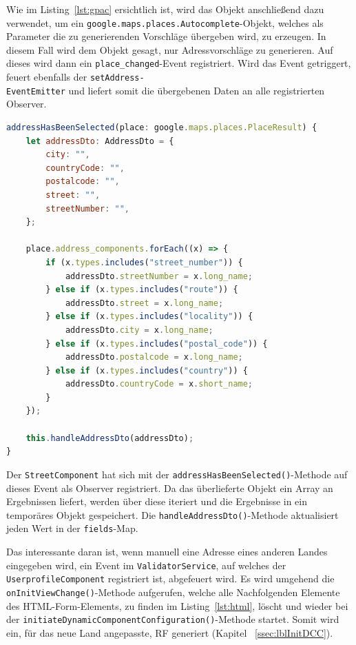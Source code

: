 Wie im Listing~\ref{lst:gpac} ersichtlich ist, wird das Objekt anschließend dazu verwendet, um ein \texttt{google.maps.places.Autocomplete}-Objekt, welches als Parameter die zu generierenden Vorschläge übergeben wird, zu erzeugen. In diesem Fall wird dem Objekt gesagt, nur Adressvorschläge zu generieren. Auf dieses wird dann ein \texttt{place\_changed}-Event registriert. Wird das Event getriggert, feuert ebenfalls der \texttt{setAddress-\\EventEmitter} und liefert somit die übergebenen Daten an alle registrierten Observer.

\begin{lstlisting}[caption={Die \texttt{addressHasBeenSelected()}-Methode der \texttt{StreetComponent}-Klasse}, language=JavaScript,label={lst:gpac}]
addressHasBeenSelected(place: google.maps.places.PlaceResult) {
	let addressDto: AddressDto = {
		city: "",
		countryCode: "",
		postalcode: "",
		street: "",
		streetNumber: "",
	};
	
	place.address_components.forEach((x) => {
		if (x.types.includes("street_number")) {
			addressDto.streetNumber = x.long_name;
		} else if (x.types.includes("route")) {
			addressDto.street = x.long_name;
		} else if (x.types.includes("locality")) {
			addressDto.city = x.long_name;
		} else if (x.types.includes("postal_code")) {
			addressDto.postalcode = x.long_name;
		} else if (x.types.includes("country")) {
			addressDto.countryCode = x.short_name;
		}
	});
	
	this.handleAddressDto(addressDto);
}
\end{lstlisting}

Der \texttt{StreetComponent} hat sich mit der \texttt{addressHasBeenSelected()}-Methode auf dieses Event als Observer registriert. Da das überlieferte Objekt ein Array an Ergebnissen liefert, werden über diese iteriert und die Ergebnisse in ein temporäres Objekt gespeichert. Die \texttt{handleAddressDto()}-Methode aktualisiert jeden Wert in der \texttt{fields}-Map. 

Das interessante daran ist, wenn manuell eine Adresse eines anderen Landes eingegeben wird, ein Event im \texttt{ValidatorService}, auf welches der \texttt{UserprofileComponent} registriert ist, abgefeuert wird. Es wird umgehend die \texttt{onInitViewChange()}-Methode aufgerufen, welche alle Nachfolgenden Elemente des HTML-Form-Elements, zu finden im Listing~\ref{lst:html}, löscht und wieder bei der \texttt{initiateDynamicComponentConfiguration()}-Methode startet. Somit wird ein, für das neue Land angepasste, RF generiert (Kapitel ~\ref{ssec:lblInitDCC}).


